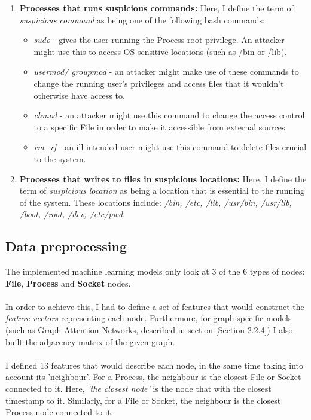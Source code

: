 \begin{enumerate}
		\item \textbf{Processes that runs suspicious commands: }Here, I define the term of \textit{suspicious command} as being one of the following bash commands:
		\begin{itemize}
			\item \textit{sudo} - gives the user running the Process root privilege. An attacker might use this to access OS-sensitive locations (such as /bin or /lib). 
			\item \textit{usermod/ groupmod} - an attacker might make use of these commands to change the running user's privileges and access files that it wouldn't otherwise have access to.
			\item \textit{chmod} - an attacker might use this command to change the access control to a specific File in order to make it accessible from external sources.
			\item \textit{rm -rf} - an ill-intended user might use this command to delete files crucial to the system. 
		\end{itemize}
	
		\item \textbf{Processes that writes to files in suspicious locations: }Here, I define the term of \textit{suspicious location} as being a location that is essential to the running of the system. These locations include:  \textit{/bin, /etc, /lib, /usr/bin, /usr/lib, /boot, /root, /dev, /etc/pwd}.
	\end{enumerate}
	\subsection{Data preprocessing}
	The implemented machine learning models only look at 3 of the 6 types of nodes: \textbf{File}, \textbf{Process} and \textbf{Socket} nodes. 
	\\ \\
	In order to achieve this, I had to define a set of features that would construct the \textit{feature vectors} representing each node. Furthermore, for graph-specific models (such as Graph Attention Networks, described in section \ref{Section 2.2.4})  I also built the adjacency matrix of the given graph. 
	\\ \\
	I defined 13 features that would describe each node, in the same time taking into account its 'neighbour'. For a Process, the neighbour is the closest File or Socket connected to it. Here, \textit{'the closest node'} is the node that with the closest timestamp to it. Similarly, for a File or Socket, the neighbour is the closest Process node connected to it.
	
